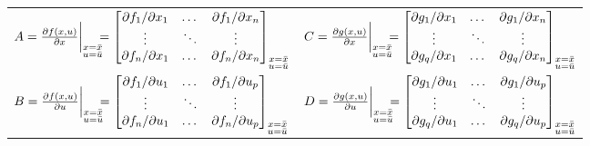 \documentclass[10pt,a4paper]{article}
\begin{document}
\begin{center}
{{\renewcommand{\arraystretch}{1.5}
\begin{tabularx}{\linewidth}{>{\centering\arraybackslash}X>{\centering\arraybackslash}X}
$ A = \frac{\partial f(x,u)}{\partial x} \bigg|_{\substack{x=\bar{x}\\u=\bar{u}}} \hspace{-2mm} = \begin{bmatrix} \partial f_1/\partial x_1 & \dots & \partial f_1/\partial x_n \\ \vdots & \ddots & \vdots \\ \partial f_n/\partial x_1 & \dots & \partial f_n/\partial x_n \end{bmatrix}_{\substack{x=\bar{x}\\u=\bar{u}}} $ &
$ C = \frac{\partial g(x,u)}{\partial x} \bigg|_{\substack{x=\bar{x}\\u=\bar{u}}} \hspace{-2mm} = \begin{bmatrix} \partial g_1/\partial x_1 & \dots & \partial g_1/\partial x_n \\ \vdots & \ddots & \vdots \\ \partial g_q/\partial x_1 & \dots & \partial g_q/\partial x_n \end{bmatrix}_{\substack{x=\bar{x}\\u=\bar{u}}} $ \\
$ B = \frac{\partial f(x,u)}{\partial u} \bigg|_{\substack{x=\bar{x}\\u=\bar{u}}} \hspace{-2mm} = \begin{bmatrix} \partial f_1/\partial u_1 & \dots & \partial f_1/\partial u_p \\ \vdots & \ddots & \vdots \\ \partial f_n/\partial u_1 & \dots & \partial f_n/\partial u_p \end{bmatrix}_{\substack{x=\bar{x}\\u=\bar{u}}} $ &
$ D = \frac{\partial g(x,u)}{\partial u} \bigg|_{\substack{x=\bar{x}\\u=\bar{u}}} \hspace{-2mm} = \begin{bmatrix} \partial g_1/\partial u_1 & \dots & \partial g_1/\partial u_p \\ \vdots & \ddots & \vdots \\ \partial g_q/\partial u_1 & \dots & \partial g_q/\partial u_p \end{bmatrix}_{\substack{x=\bar{x}\\u=\bar{u}}} $ \\
\end{tabularx}
}}
\end{center}
\end{document}

